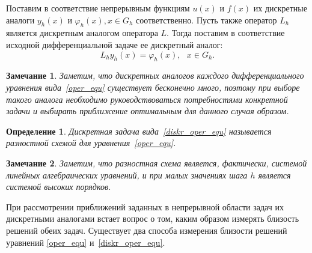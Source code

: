 \documentclass[11pt,a4paper,twoside,listtotoc,bibtotoc]{report}
\numberwithin{equation}{section}
\newtheorem*{definition}{Определение}
\theoremstyle{definition}
\theoremstyle{plain}
\newtheorem*{note*}{Замечание}
\begin{document}
Поставим в соответствие непрерывным функциям $u(x)$ и $f(x)$ их дискретные аналоги
$y_h(x)$ и $\varphi_h(x), x \in G_h$ соответственно. Пусть также оператор $L_h$ является
дискретным аналогом оператора $L$. Тогда поставим в
соответствие исходной дифференциальной задаче ее дискретный аналог:
%
\begin{equation}
%
    \label{diskr_oper_equ}
    L_h{y_h(x)} = \varphi_h(x),~~~x\in G_h.
\end{equation}
%
\begin{note*}
    Заметим, что дискретных аналогов каждого дифференциального уравнения
    вида~\eqref{oper_equ}
    существует бесконечно много, поэтому при выборе такого аналога необходимо
    руководствоваться потребностями конкретной задачи и выбирать приближение
    оптимальным для данного случая образом.
\end{note*}
%
\begin{definition}
%
    Дискретная задача вида~\eqref{diskr_oper_equ} называется
    разностной схемой для уравнения~\eqref{oper_equ}.
%
\end{definition}
%
\begin{note*}
%
    Заметим, что разностная схема является, фактически, системой линейных алгебраических
    уравнений, и при малых значениях шага $h$ является системой высоких порядков.
%
\end{note*}
%

При рассмотрении приближений заданных в непрерывной области задач их дискретными
аналогами встает вопрос о том, каким образом измерять близость решений обеих задач.
Существует два способа измерения близости решений уравнений
\eqref{oper_equ} и~\eqref{diskr_oper_equ}.
\end{document}
